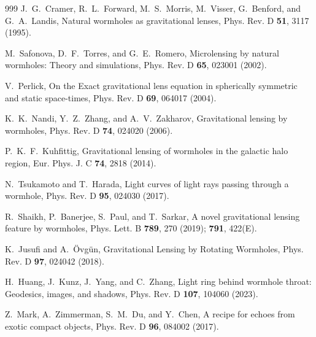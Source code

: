 \documentclass[aps,preprint,groupedaddress,nofootinbib,superscriptaddress,showkeys,showpacs,eqsecnum,amsmath,amssymb]{revtex4-1}
\begin{document}
\begin{thebibliography}{999}
J.~G.~Cramer, R.~L.~Forward, M.~S.~Morris, M.~Visser, G.~Benford, and G.~A.~Landis,
Natural wormholes as gravitational lenses,
Phys. Rev. D \textbf{51}, 3117 (1995).

M.~Safonova, D.~F.~Torres, and G.~E.~Romero,
Microlensing by natural wormholes: Theory and simulations,
Phys. Rev. D \textbf{65}, 023001 (2002).

V.~Perlick,
On the Exact gravitational lens equation in spherically symmetric and static space-times,
Phys. Rev. D \textbf{69}, 064017 (2004).

K.~K.~Nandi, Y.~Z.~Zhang, and A.~V.~Zakharov,
Gravitational lensing by wormholes,
Phys. Rev. D \textbf{74}, 024020 (2006).

P.~K.~F.~Kuhfittig,
Gravitational lensing of wormholes in the galactic halo region,
Eur. Phys. J. C \textbf{74}, 2818 (2014).

N.~Tsukamoto and T.~Harada,
Light curves of light rays passing through a wormhole,
Phys. Rev. D \textbf{95}, 024030 (2017).

R.~Shaikh, P.~Banerjee, S.~Paul, and T.~Sarkar,
A novel gravitational lensing feature by wormholes,
Phys. Lett. B \textbf{789}, 270 (2019); \textbf{791}, 422(E).

K.~Jusufi and A.~\"Ovg\"un,
Gravitational Lensing by Rotating Wormholes,
Phys. Rev. D \textbf{97}, 024042 (2018).

H.~Huang, J.~Kunz, J.~Yang, and C.~Zhang,
Light ring behind wormhole throat: Geodesics, images, and shadows,
Phys. Rev. D \textbf{107}, 104060 (2023).

Z.~Mark, A.~Zimmerman, S.~M.~Du, and Y.~Chen,
A recipe for echoes from exotic compact objects,
Phys. Rev. D \textbf{96}, 084002 (2017).


\end{thebibliography}
\end{document}

